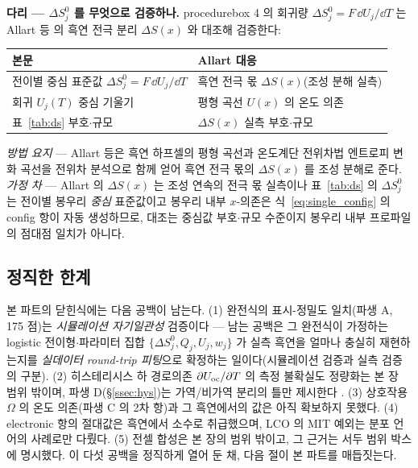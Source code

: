 \begin{srcbox}
\textbf{다리 --- $\Delta S^0_j$ 를 무엇으로 검증하나.} procedurebox 4 의 회귀량 $\Delta S^0_j=F\,\dd
U_j/\dd T$ 는 Allart 등\cite{allart2018} 의 흑연 전극 분리 $\Delta S(x)$ 와 대조해 검증한다:
\begin{center}\footnotesize
\begin{tabular}{@{}ll@{}}
\hline
본문 & Allart\cite{allart2018} 대응 \\
\hline
전이별 중심 표준값 $\Delta S^0_j=F\,\dd U_j/\dd T$ & 흑연 전극 몫 $\Delta S(x)$(조성 분해 실측) \\
회귀 $U_j(T)$ 중심 기울기 & 평형 곡선 $U(x)$ 의 온도 의존 \\
표~\ref{tab:ds} 부호$\cdot$규모 & $\Delta S(x)$ 실측 부호$\cdot$규모 \\
\hline
\end{tabular}
\end{center}
\emph{방법 요지} --- Allart 등은 흑연 하프셀의 평형 곡선과 온도계단 전위차법 엔트로피 변화 곡선을 전위차
분석으로 함께 얻어 흑연 전극 몫의 $\Delta S(x)$ 를 조성 분해로 준다. \emph{가정 차} --- Allart 의 $\Delta S(x)$
는 조성 연속의 전극 몫 실측이나 표~\ref{tab:ds} 의 $\Delta S^0_j$ 는 전이별 봉우리 \emph{중심} 표준값이고
봉우리 내부 $x$-의존은 식~\eqref{eq:single_config} 의 config 항이 자동 생성하므로, 대조는 중심값
부호$\cdot$규모 수준이지 봉우리 내부 프로파일의 점대점 일치가 아니다.
\end{srcbox}

\subsection{정직한 한계}\label{ssec:gaps}
본 파트의 닫힌식에는 다음 공백이 남는다. (1) 완전식의 표시-정밀도 일치(파생 A, 175 점)는 \emph{시뮬레이션
자기일관성} 검증이다 --- 남는 공백은 그 완전식이 가정하는 logistic 전이형$\cdot$파라미터 집합
$\{\Delta S^0_j,Q_j,U_j,w_j\}$ 가 실측 흑연을 얼마나 충실히 재현하는지를 \emph{실데이터 round-trip 피팅}으로
확정하는 일이다(시뮬레이션 검증과 실측 검증의 구분). (2) 히스테리시스 하 경로의존 $\partial U_{\mathrm{oc}}/\partial T$ 의
측정 불확실도 정량화는 본 장 범위 밖이며, 파생 D(\S\ref{ssec:hys})는 가역/비가역 분리의 틀만 제시한다
\cite{hysteresis2018}. (3) 상호작용 $\Omega$ 의 온도 의존(파생 C 의 2차 항)과 그 흑연에서의 값은 아직
확보하지 못했다. (4) electronic 항의 절대값은 흑연에서 소수로 취급했으며, LCO 의 MIT 예외는 분포 언어의
사례로만 다뤘다. (5) 전셀 합성은 본 장의 범위 밖이고, 그 근거는 서두 범위 박스에 명시했다. 이 다섯 공백을
정직하게 열어 둔 채, 다음 절이 본 파트를 매듭짓는다.

